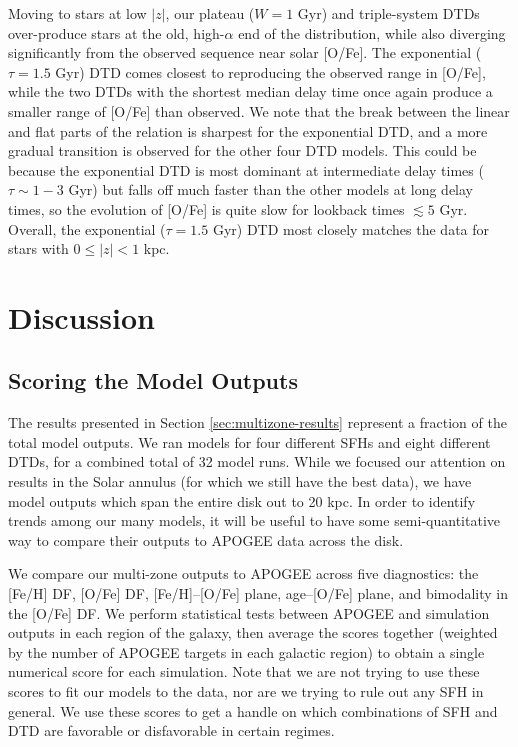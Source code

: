 \documentclass[twocolumn,twocolappendix,linenumbers,trackchanges]{aastex631}
\begin{document}
Moving to stars at low $|z|$, our plateau ($W=1$ Gyr) and triple-system DTDs over-produce stars at the old, high-$\alpha$ end of the distribution, while also diverging significantly from the observed sequence near solar [O/Fe]. The exponential ($\tau=1.5$ Gyr) DTD comes closest to reproducing the observed range in [O/Fe], while the two DTDs with the shortest median delay time once again produce a smaller range of [O/Fe] than observed. We note that the break between the linear and flat parts of the relation is sharpest for the exponential DTD, and a more gradual transition is observed for the other four DTD models. This could be because the exponential DTD is most dominant at intermediate delay times ($\tau\sim 1-3$ Gyr) but falls off much faster than the other models at long delay times, so the evolution of [O/Fe] is quite slow for lookback times $\lesssim 5$ Gyr. Overall, the exponential ($\tau=1.5$ Gyr) DTD most closely matches the data for stars with $0\leq|z|<1$ kpc.

\section{Discussion}
\label{sec:discussion}

\subsection{Scoring the Model Outputs}
\label{sec:scores}

The results presented in Section \ref{sec:multizone-results} represent a fraction of the total model outputs. We ran models for four different SFHs and eight different DTDs, for a combined total of 32 model runs. While we focused our attention on results in the Solar annulus (for which we still have the best data), we have model outputs which span the entire disk out to 20 kpc. In order to identify trends among our many models, it will be useful to have some semi-quantitative way to compare their outputs to APOGEE data across the disk.

We compare our multi-zone outputs to APOGEE across five diagnostics: the [Fe/H] DF, [O/Fe] DF, [Fe/H]--[O/Fe] plane, age--[O/Fe] plane, and bimodality in the [O/Fe] DF. We perform statistical tests between APOGEE and simulation outputs in each region of the galaxy, then average the scores together (weighted by the number of APOGEE targets in each galactic region) to obtain a single numerical score for each simulation. Note that we are not trying to use these scores to fit our models to the data, nor are we trying to rule out any SFH in general. We use these scores to get a handle on which combinations of SFH and DTD are favorable or disfavorable in certain regimes. 
\end{document}
